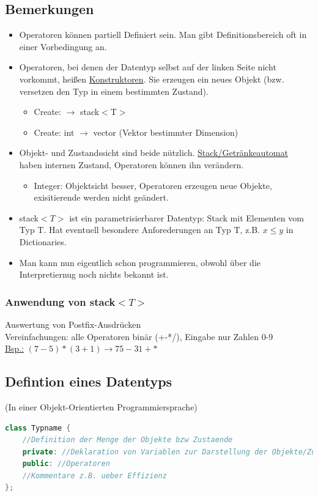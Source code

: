 \documentclass[a4paper]{article}
\begin{document}
\subsection*{Bemerkungen}
\begin{itemize}
\item Operatoren können partiell Definiert sein. Man gibt Definitionsbereich oft in einer Vorbedingung an.
\item Operatoren, bei denen der Datentyp selbst auf der linken Seite nicht vorkommt, heißen \underline{Konstruktoren}. Sie erzeugen ein neues Objekt (bzw. versetzen den Typ in einem bestimmten Zustand).
	\begin{itemize}
		\item Create: $\rightarrow$ stack$<$T$>$
		\item Create: int $\rightarrow$ vector (Vektor bestimmter Dimension)
	\end{itemize}
\item Objekt- und Zustandssicht sind beide nützlich. \underline{Stack/Getränkeautomat} haben internen Zustand, Operatoren können ihn verändern.
	\begin{itemize}
		\item Integer: Objektsicht besser, Operatoren erzeugen neue Objekte, exisitierende werden nicht geändert.
	\end{itemize}
\item stack$<T>$ ist ein parametrisierbarer Datentyp: Stack mit Elementen vom Typ T. Hat eventuell besondere Anforederungen an Typ T, z.B. $x\leq y$ in Dictionaries.
\item Man kann nun eigentlich schon programmieren, obwohl über die Interpretiernug noch nichts bekannt ist.

\end{itemize}
\subsubsection*{Anwendung von stack$<T>$}
Auswertung von Postfix-Ausdrücken\\
Vereinfachungen: alle Operatoren binär (+-*/), Eingabe nur Zahlen 0-9\\
\underline{Bsp.:} $(7-5)*(3+1)\rightarrow 75-31+*$
\subsection*{Defintion eines Datentyps}
(In einer Objekt-Orientierten Programmiersprache)\\
\begin{lstlisting}[language=c++]
class Typname {
	//Definition der Menge der Objekte bzw Zustaende
	private: //Deklaration von Variablen zur Darstellung der Objekte/Zustaende
	public: //Operatoren
	//Kommentare z.B. ueber Effizienz
};
\end{lstlisting}
\end{document}
